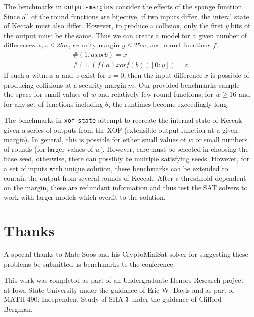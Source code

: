 \documentclass[final]{ieee}
\begin{document}
The benchmarks in \texttt{output-margins} consider the effects of the sponge
function. Since all of the round functions are bijective, if two inputs differ,
the interal state of Keccak must also differ. However, to produce a collision,
only the first $y$ bits of the output must be the same. Thus we can create
a model for a given number of differences $x, z \leq 25w$, security margin
$y \leq 25w$, and round functions $f$:
\begin{align*}
    & \#(1, a xor b) = x \\
    & \#(1, (f(a) xor f(b))[0:y]) = z
\end{align*}
If such a witness a and b exist for $z=0$, then the input difference $x$ is
possible of producing collisions at a security margin $m$. Our provided
benchmarks sample the space for small values of $w$ and relatively few
round functions; for $w\geq 16$ and for any set of functions including
$\theta$, the runtimes become exceedingly long.

The benchmarks in \texttt{xof-state} attempt to recreate the internal state
of Keccak given a series of outputs from the XOF (extensible output function
at a given margin). In general, this is possible for either small values of
$w$ or small numbers of rounds (for larger values of $w$). However, care must
be selected in choosing the base seed, otherwise, there can possibly be
multiple satisfying seeds. However, for a set of inputs with unique solution,
these benchmarks can be extended to contain the output from several rounds of
Keccak. After a threshhold dependent on the margin, these are redundant
information and thus test the SAT solvers to work with larger models which
overfit to the solution.

\section{Thanks}
A special thanks to Mate Soos and his CryptoMiniSat solver
\cite{CryptoMiniSat5} for suggesting these problems be submitted as benchmarks
to the conference.

This work was completed as part of an Undergraduate Honors Research project
at Iowa State University under the guidance of Eric W. Davis and as part of
MATH 490: Independent Study of SHA-3 under the guidance of Clifford Bergman.




\vfill
\pagebreak
\end{document}

